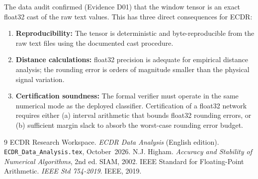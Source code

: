 \documentclass[11pt, a4paper]{article}
\theoremstyle{definition}
\theoremstyle{plain}
\newcommand{\code}[1]{\texttt{#1}}
\begin{document}
The data audit confirmed (Evidence D01) that the window tensor is an exact float32
cast of the raw text values. This has three direct consequences for ECDR:
\begin{enumerate}[leftmargin=1.5em]
  \item \textbf{Reproducibility:} The tensor is deterministic and byte-reproducible
        from the raw text files using the documented cast procedure.
  \item \textbf{Distance calculations:} float32 precision is adequate for empirical
        distance analysis; the rounding error is orders of magnitude smaller than
        the physical signal variation.
  \item \textbf{Certification soundness:} The formal verifier must operate in the
        same numerical mode as the deployed classifier. Certification of a float32
        network requires either (a) interval arithmetic that bounds float32 rounding
        errors, or (b) sufficient margin slack to absorb the worst-case rounding
        error budget.
\end{enumerate}

\begin{thebibliography}{9}
  ECDR Research Workspace. \textit{ECDR Data Analysis} (English edition).
  \code{ECDR\_Data\_Analysis.tex}, October~2026.
  N.J. Higham. \textit{Accuracy and Stability of Numerical Algorithms}, 2nd ed.
  SIAM, 2002.
  IEEE Standard for Floating-Point Arithmetic. \textit{IEEE Std 754-2019}.
  IEEE, 2019.
\end{thebibliography}
\end{document}
